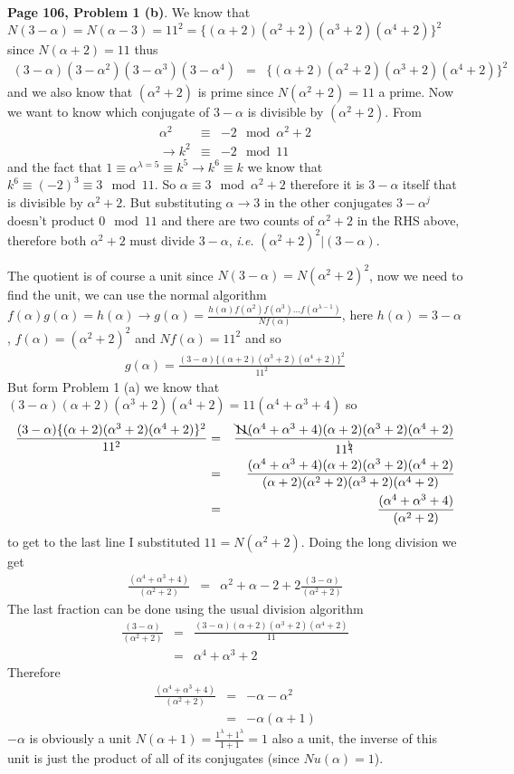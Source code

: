\documentclass[aps,preprint,preprintnumbers,nofootinbib,showpacs,prd]{revtex4-1}
\newcommand{\ie}{{\it i.e.} }
\newcommand{\nbea}{\begin{eqnarray*}}
\newcommand{\neea}{\end{eqnarray*}}
\begin{document}
{\bf Page 106, Problem 1 (b)}. We know that $N(3 - \alpha) = N(\alpha - 3) = 11^2 = \{(\alpha + 2)(\alpha^2 + 2)(\alpha^3 + 2)(\alpha^4 + 2)\}^2$ since $N(\alpha + 2) = 11$ thus
%
\nbea
(3 - \alpha)(3 - \alpha^2)(3 - \alpha^3)(3 - \alpha^4) & = & \{(\alpha + 2)(\alpha^2 + 2)(\alpha^3 + 2)(\alpha^4 + 2)\}^2
\neea
%
and we also know that $(\alpha^2 + 2)$ is prime since $N(\alpha^2 + 2) = 11$ a prime. Now we want to know which conjugate of $3 - \alpha$ is divisible by $(\alpha^2 + 2)$. From
%
\nbea
\alpha^2 & \equiv & -2 \mod{\alpha^2 + 2} \\
\to k^2 & \equiv & -2 \mod{11}
\neea
%
and the fact that $1 \equiv \alpha^{\lambda = 5} \equiv k^5 \to k^6 \equiv k$ we know that $k^6 \equiv (-2)^3 \equiv 3 \mod{11}$. So $\alpha \equiv 3 \mod{\alpha^2 + 2}$ therefore it is $3 - \alpha$ itself that is divisible by $\alpha^2 + 2$. But substituting $\alpha \to 3$ in the other conjugates $3 - \alpha^j$ doesn't product $0 \mod{11}$ and there are two counts of $\alpha^2 + 2$ in the RHS above, therefore both $\alpha^2 + 2$ must divide $3 - \alpha$, \ie $(\alpha^2 + 2)^2 | (3 - \alpha)$.

The quotient is of course a unit since $N(3 - \alpha) = N(\alpha^2 + 2)^2$, now we need to find the unit, we can use the normal algorithm $f(\alpha)g(\alpha) = h(\alpha) \to g(\alpha) = \frac{h(\alpha)f(\alpha^2)f(\alpha^3)\dots f(\alpha^{\lambda-1})}{Nf(\alpha)}$, here $h(\alpha) = 3 - \alpha$, $f(\alpha) = (\alpha^2 + 2)^2$ and $Nf(\alpha) = 11^2$ and so
%
\nbea
g(\alpha) = \frac{(3-\alpha)\{(\alpha + 2)(\alpha^3 + 2)(\alpha^4 + 2)\}^2}{11^2}
\neea
%
But form Problem 1 (a) we know that $(3-\alpha)(\alpha + 2)(\alpha^3 + 2)(\alpha^4 + 2) = 11(\alpha^4 + \alpha^3 + 4)$ so
%
\nbea
\frac{(3-\alpha)\{(\alpha + 2)(\alpha^3 + 2)(\alpha^4 + 2)\}^2}{11^2} & = & \frac{\bcancel{11}(\alpha^4 + \alpha^3 + 4)(\alpha + 2)(\alpha^3 + 2)(\alpha^4 + 2)}{11^{\bcancel{2}}} \\
& = & \frac{(\alpha^4 + \alpha^3 + 4)(\alpha + 2)(\alpha^3 + 2)(\alpha^4 + 2)}{(\alpha + 2)(\alpha^2 + 2)(\alpha^3 + 2)(\alpha^4 + 2)} \\
& = & \frac{(\alpha^4 + \alpha^3 + 4)}{(\alpha^2 + 2)}
\neea
%
to get to the last line I substituted $11 = N(\alpha^2 + 2)$. Doing the long division we get
%
\nbea
\frac{(\alpha^4 + \alpha^3 + 4)}{(\alpha^2 + 2)} & = & \alpha^2 + \alpha - 2 + 2\frac{(3 - \alpha)}{(\alpha^2 + 2)}
\neea
%
The last fraction can be done using the usual division algorithm
%
\nbea
\frac{(3 - \alpha)}{(\alpha^2 + 2)} & = & \frac{(3 - \alpha)(\alpha + 2)(\alpha^3 + 2)(\alpha^4 + 2)}{11} \\
& = & \alpha^4 + \alpha^3 + 2
\neea
%
Therefore
%
\nbea
\frac{(\alpha^4 + \alpha^3 + 4)}{(\alpha^2 + 2)} & = & -\alpha - \alpha^2 \\
& = & -\alpha(\alpha + 1)
\neea
%
$-\alpha$ is obviously a unit $N(\alpha + 1) = \frac{1^\lambda + 1^\lambda}{1 + 1} = 1$ also a unit, the inverse of this unit is just the product of all of its conjugates (since $Nu(\alpha) = 1$).
\end{document}
